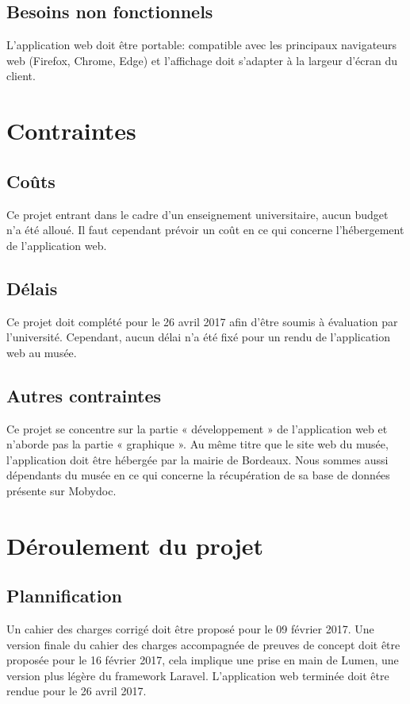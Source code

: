 \documentclass[a4paper]{article}
\begin{document}
\newpage

\subsection{Besoins non fonctionnels}
L'application web doit être portable: compatible avec les principaux navigateurs web (Firefox, Chrome, Edge) et l'affichage doit s'adapter à la largeur d'écran du client.\\

\section{Contraintes}
\subsection{Coûts}
Ce projet entrant dans le cadre d'un enseignement universitaire, aucun budget n'a été alloué. Il faut cependant prévoir un coût en ce qui concerne l'hébergement de l'application web.
\subsection{Délais}
Ce projet doit complété pour le 26 avril 2017 afin d'être soumis à évaluation par l'université. Cependant, aucun délai n'a été fixé pour un rendu de l'application web au musée.
\subsection{Autres contraintes}
Ce projet se concentre sur la partie « développement » de l’application web et n’aborde pas la partie « graphique ». Au même titre que le site web du musée, l’application doit être hébergée par la mairie de Bordeaux. Nous sommes aussi dépendants du musée en ce qui concerne la récupération de sa base de données présente sur Mobydoc.

\section{Déroulement du projet}
\subsection{Plannification}
Un cahier des charges corrigé doit être proposé pour le 09 février 2017. Une version finale du cahier des charges accompagnée de preuves de concept doit être proposée pour le 16 février 2017, cela implique une prise en main de Lumen, une version plus légère du framework Laravel. L'application web terminée doit être rendue pour le 26 avril 2017.
\end{document}
